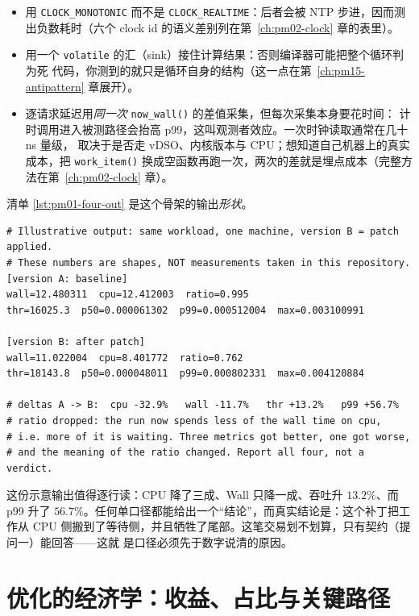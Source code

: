 \documentclass[12pt,a4paper,fontset=fandol]{ctexbook}
\newcommand{\Fn}[1]{\texttt{#1()}}
\newcommand{\Tp}[1]{\texttt{#1}}
\newcommand{\Bk}{\discretionary{}{}{}}
\newcommand{\Lang}[1]{\textsf{#1}}
\newcommand{\MWall}{\Lang{Wall}}
\newcommand{\MCpu}{\Lang{CPU}}
\newcommand{\Mx}[1]{\textsf{#1}}
\begin{document}
\begin{itemize}
  \item 用 \Tp{CLOCK{\Bk}\_MONOTONIC} 而不是 \Tp{CLOCK{\Bk}\_REALTIME}：后者会被 NTP
    步进，因而测出负数耗时（六个 clock id 的语义差别列在第~\ref{ch:pm02-clock} 章的表里）。
  \item 用一个 \Tp{volatile} 的汇（sink）接住计算结果：否则编译器可能把整个循环判为死
    代码，你测到的就只是循环自身的结构（这一点在第~\ref{ch:pm15-antipattern} 章展开）。
  \item 逐请求延迟用\emph{同一次} \Fn{now\_wall} 的差值采集，但每次采集本身要花时间：
    计时调用进入被测路径会抬高 \Mx{p99}，这叫观测者效应。一次时钟读取通常在几十 ns 量级，
    取决于是否走 vDSO、内核版本与 CPU；想知道自己机器上的真实成本，把 \Fn{work\_item}
    换成空函数再跑一次，两次的差就是埋点成本（完整方法在第~\ref{ch:pm02-clock} 章）。
\end{itemize}

清单 \ref{lst:pm01-four-out} 是这个骨架的输出\emph{形状}。

\begin{lstlisting}[style=outstyle,caption={四个口径在一次运行中的读数——格式示例
（示意输出，非本仓库实测值；本册的构建与 CI 环境没有 PMU 权限、通常也没有 perf）},
label={lst:pm01-four-out}]
# Illustrative output: same workload, one machine, version B = patch applied.
# These numbers are shapes, NOT measurements taken in this repository.
[version A: baseline]
wall=12.480311  cpu=12.412003  ratio=0.995
thr=16025.3  p50=0.000061302  p99=0.000512004  max=0.003100991

[version B: after patch]
wall=11.022004  cpu=8.401772  ratio=0.762
thr=18143.8  p50=0.000048011  p99=0.000802331  max=0.004120884

# deltas A -> B:  cpu -32.9%   wall -11.7%   thr +13.2%   p99 +56.7%
# ratio dropped: the run now spends less of the wall time on cpu,
# i.e. more of it is waiting. Three metrics got better, one got worse,
# and the meaning of the ratio changed. Report all four, not a verdict.
\end{lstlisting}

这份示意输出值得逐行读：\MCpu{} 降了三成、\MWall{} 只降一成、吞吐升 $13.2\%$、而
\Mx{p99} 升了 $56.7\%$。任何单口径都能给出一个``结论''，而真实结论是：这个补丁把工作从
CPU 侧搬到了等待侧，并且牺牲了尾部。这笔交易划不划算，只有契约（提问一）能回答——这就
是口径必须先于数字说清的原因。

\section{优化的经济学：收益、占比与关键路径}
\label{sec:pm01-economics}
\end{document}
